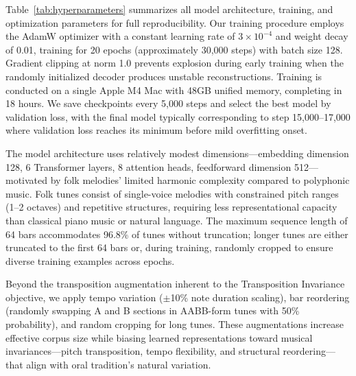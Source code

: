 \documentclass[]{interact}
\theoremstyle{plain}
\theoremstyle{definition}
\theoremstyle{remark}
\begin{document}
Table~\ref{tab:hyperparameters} summarizes all model architecture, training, and optimization parameters for full reproducibility. Our training procedure employs the AdamW optimizer with a constant learning rate of $3 \times 10^{-4}$ and weight decay of 0.01, training for 20 epochs (approximately 30,000 steps) with batch size 128. Gradient clipping at norm 1.0 prevents explosion during early training when the randomly initialized decoder produces unstable reconstructions. Training is conducted on a single Apple M4 Mac with 48GB unified memory, completing in 18 hours. We save checkpoints every 5,000 steps and select the best model by validation loss, with the final model typically corresponding to step 15,000--17,000 where validation loss reaches its minimum before mild overfitting onset.

The model architecture uses relatively modest dimensions—embedding dimension 128, 6 Transformer layers, 8 attention heads, feedforward dimension 512—motivated by folk melodies' limited harmonic complexity compared to polyphonic music. Folk tunes consist of single-voice melodies with constrained pitch ranges (1--2 octaves) and repetitive structures, requiring less representational capacity than classical piano music or natural language. The maximum sequence length of 64 bars accommodates 96.8\% of tunes without truncation; longer tunes are either truncated to the first 64 bars or, during training, randomly cropped to ensure diverse training examples across epochs.

Beyond the transposition augmentation inherent to the Transposition Invariance objective, we apply tempo variation ($\pm$10\% note duration scaling), bar reordering (randomly swapping A and B sections in AABB-form tunes with 50\% probability), and random cropping for long tunes. These augmentations increase effective corpus size while biasing learned representations toward musical invariances—pitch transposition, tempo flexibility, and structural reordering—that align with oral tradition's natural variation.
\end{document}
